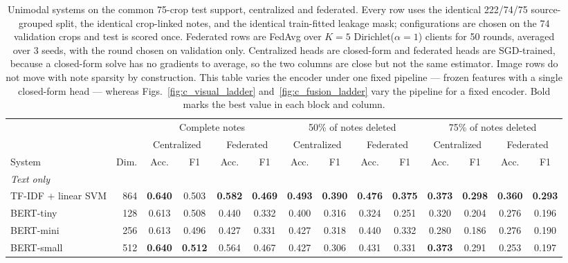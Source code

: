 \documentclass[conference]{IEEEtran}
\begin{document}
\begin{table}[t]
\caption{Unimodal systems on the common 75-crop test support, centralized and federated. Every row uses the identical 222/74/75 source-grouped split, the identical crop-linked notes, and the identical train-fitted leakage mask; configurations are chosen on the 74 validation crops and test is scored once. Federated rows are FedAvg over $K{=}5$ Dirichlet($\alpha{=}1$) clients for 50 rounds, averaged over 3 seeds, with the round chosen on validation only. Centralized heads are closed-form and federated heads are SGD-trained, because a closed-form solve has no gradients to average, so the two columns are close but not the same estimator. Image rows do not move with note sparsity by construction. This table varies the encoder under one fixed pipeline --- frozen features with a single closed-form head --- whereas Figs.~\ref{fig:c_visual_ladder} and~\ref{fig:c_fusion_ladder} vary the pipeline for a fixed encoder. Bold marks the best value in each block and column.}
\label{tab:unimodal_cent_fed}
\centering\footnotesize
\setlength\tabcolsep{4pt}
\begin{tabular}{lrcccccccccccc}
\toprule
 &  & \multicolumn{4}{c}{Complete notes} & \multicolumn{4}{c}{50\% of notes deleted} & \multicolumn{4}{c}{75\% of notes deleted}\\
\cmidrule(lr){3-6}\cmidrule(lr){7-10}\cmidrule(lr){11-14}
 &  & \multicolumn{2}{c}{Centralized} & \multicolumn{2}{c}{Federated} & \multicolumn{2}{c}{Centralized} & \multicolumn{2}{c}{Federated} & \multicolumn{2}{c}{Centralized} & \multicolumn{2}{c}{Federated}\\
\cmidrule(lr){3-4}\cmidrule(lr){5-6}\cmidrule(lr){7-8}\cmidrule(lr){9-10}\cmidrule(lr){11-12}\cmidrule(lr){13-14}
System & Dim. & Acc. & F1 & Acc. & F1 & Acc. & F1 & Acc. & F1 & Acc. & F1 & Acc. & F1\\
\midrule
\multicolumn{14}{l}{\emph{Text only}}\\
TF-IDF $+$ linear SVM & 864 & \textbf{0.640} & 0.503 & \textbf{0.582} & \textbf{0.469} & \textbf{0.493} & \textbf{0.390} & \textbf{0.476} & \textbf{0.375} & \textbf{0.373} & \textbf{0.298} & \textbf{0.360} & \textbf{0.293}\\
BERT-tiny & 128 & 0.613 & 0.508 & 0.440 & 0.332 & 0.400 & 0.316 & 0.324 & 0.251 & 0.320 & 0.204 & 0.276 & 0.196\\
BERT-mini & 256 & 0.613 & 0.496 & 0.427 & 0.331 & 0.427 & 0.318 & 0.440 & 0.332 & 0.280 & 0.186 & 0.276 & 0.190\\
BERT-small & 512 & \textbf{0.640} & \textbf{0.512} & 0.564 & 0.467 & 0.427 & 0.306 & 0.431 & 0.331 & \textbf{0.373} & 0.291 & 0.253 & 0.197\\

\end{tabular}
\end{table}
\end{document}
